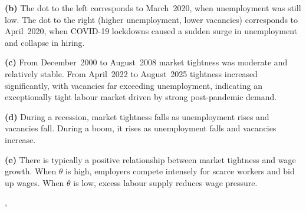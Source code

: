 {{    \textbf{(b)} The dot to the left corresponds to March~2020, when
    unemployment was still low. The dot to the right (higher unemployment,
    lower vacancies) corresponds to April~2020, when COVID-19 lockdowns
    caused a sudden surge in unemployment and collapse in hiring.

    \textbf{(c)} From December~2000 to August~2008 market tightness was
    moderate and relatively stable. From April~2022 to August~2025 tightness
    increased significantly, with vacancies far exceeding unemployment,
    indicating an exceptionally tight labour market driven by strong
    post-pandemic demand.

    \textbf{(d)} During a recession, market tightness falls as unemployment
    rises and vacancies fall. During a boom, it rises as unemployment falls
    and vacancies increase.

    \textbf{(e)} There is typically a positive relationship between market
    tightness and wage growth. When $\theta$ is high, employers compete
    intensely for scarce workers and bid up wages. When $\theta$ is low,
    excess labour supply reduces wage pressure.
  },
}
